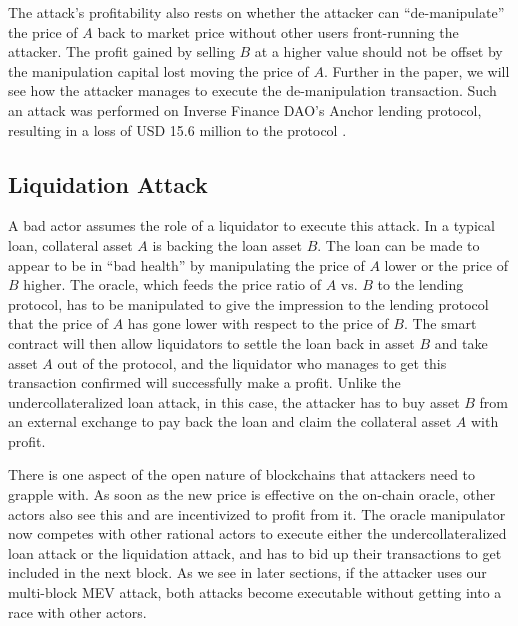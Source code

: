 The attack's profitability also rests on whether the attacker can ``de-manipulate'' the price of $A$ back to market price without other users front-running the attacker. The profit gained by selling $B$ at a higher value should not be offset by the manipulation capital lost moving the price of $A$. Further in the paper, we will see how the attacker manages to execute the de-manipulation transaction. Such an attack was performed on Inverse Finance DAO's Anchor lending protocol, resulting in a loss of USD 15.6 million to the protocol \cite{inverse_finance_hack}.

\subsection{Liquidation Attack\label{SectionLiquidationAttack}}
A bad actor assumes the role of a liquidator to execute this attack. In a typical loan, collateral asset $A$ is backing the loan asset $B$. The loan can be made to appear to be in ``bad health'' by manipulating the price of $A$ lower or the price of $B$ higher. The oracle, which feeds the price ratio of $A$ vs. $B$ to the lending protocol, has to be manipulated to give the impression to the lending protocol that the price of $A$ has gone lower with respect to the price of $B$. The smart contract will then allow liquidators to settle the loan back in asset $B$ and take asset $A$ out of the protocol, and the liquidator who manages to get this transaction confirmed will successfully make a profit. Unlike the undercollateralized loan attack, in this case, the attacker has to buy asset $B$ from an external exchange to pay back the loan and claim the collateral asset $A$ with profit.

There is one aspect of the open nature of blockchains that attackers need to grapple with. As soon as the new price is effective on the on-chain oracle, other actors also see this and are incentivized to profit from it. The oracle manipulator now competes with other rational actors to execute either the undercollateralized loan attack or the liquidation attack, and has to bid up their transactions to get included in the next block. As we see in later sections, if the attacker uses our multi-block MEV attack, both attacks become executable without getting into a race with other actors.


